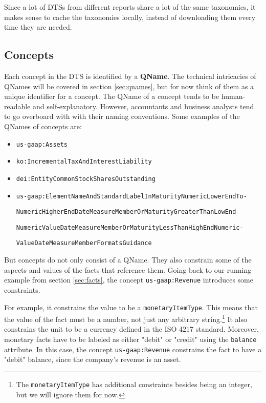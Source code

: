 Since a lot of DTSs from different reports share a lot of the same taxonomies, it makes sense to cache the taxonomies locally, 
instead of downloading them every time they are needed.

\subsection{Concepts}

Each concept in the DTS is identified by a \textbf{QName}. 
The technical intricacies of QNames will be covered in section \ref{sec:qnames}, but for now think of them as a unique identifier for a concept.
The QName of a concept tends to be human-readable and self-explanatory. 
However, accountants and business analysts tend to go overboard with with their naming conventions.
Some examples of the QNames of concepts are:

\begin{itemize}
    \item \texttt{us-gaap:Assets}
    \item \texttt{ko:IncrementalTaxAndInterestLiability}
    \item \texttt{dei:EntityCommonStockSharesOutstanding}
    \item \texttt{us-gaap:ElementNameAndStandardLabelInMaturityNumericLowerEndTo-} 
    
    \texttt{NumericHigherEndDateMeasureMemberOrMaturityGreaterThanLowEnd-}
    
    \texttt{NumericValueDateMeasureMemberOrMaturityLessThanHighEndNumeric-}
    
    \texttt{ValueDateMeasureMemberFormatsGuidance}
\end{itemize}

But concepts do not only consist of a QName.
They also constrain some of the aspects and values of the facts that reference them.
Going back to our running example from section \ref{sec:facts}, the concept \texttt{us-gaap:Revenue} introduces some constraints.

For example, it constrains the value to be a \texttt{monetaryItemType}.
This means that the value of the fact must be a number, 
not just any arbitrary string.\footnote{The \texttt{monetaryItemType} has additional constraints besides being an integer, but we will ignore them for now.}
It also constrains the unit to be a currency defined in the ISO 4217 standard.\cite{eba2018filingrules}
Moreover, monetary facts have to be labeled as either "debit" or "credit" using the \texttt{balance} attribute.
In this case, the concept \texttt{us-gaap:Revenue} constrains the fact to have a "debit" balance, since the company's revenue is an asset.

